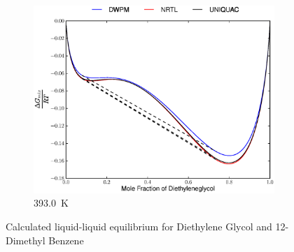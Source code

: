 \vspace*{\fill}
\clearpage
\begin{figure}[hpt]
\ContinuedFloat 
\begin{subfigure}[h]{0.5\textwidth}
	\centering
	\includegraphics[width = \textwidth]{Results_Parts/BinaryParams/diethyleneglycol-12-dimethylbenzene/AllModelsGibbsPlots/T_393.0.eps}
	\caption{393.0~$\mathrm{K}$} 
\end{subfigure}
\caption[]{Calculated liquid-liquid equilibrium for Diethylene Glycol and 12-Dimethyl Benzene}
\end{figure}
\clearpage


